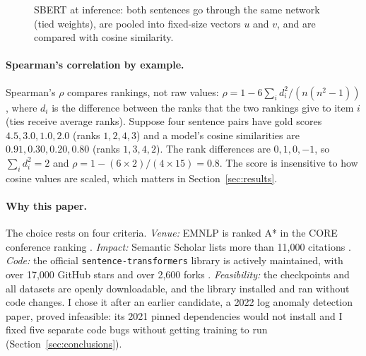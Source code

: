 \documentclass[11pt]{article}
\begin{document}
\begin{figure}[t]
\centering
{}
\caption{SBERT at inference: both sentences go through the same network (tied weights), are pooled into fixed-size vectors $u$ and $v$, and are compared with cosine similarity.}
\label{fig:sbert}
\end{figure}

\paragraph{Spearman's correlation by example.}
Spearman's $\rho$ compares rankings, not raw values: $\rho = 1 - 6\sum_i d_i^2 / (n(n^2-1))$, where $d_i$ is the difference between the ranks that the two rankings give to item $i$ (ties receive average ranks). Suppose four sentence pairs have gold scores $4.5, 3.0, 1.0, 2.0$ (ranks $1,2,4,3$) and a model's cosine similarities are $0.91, 0.30, 0.20, 0.80$ (ranks $1,3,4,2$). The rank differences are $0,1,0,-1$, so $\sum_i d_i^2 = 2$ and $\rho = 1 - (6\times 2)/(4\times 15) = 0.8$. The score is insensitive to how cosine values are scaled, which matters in Section~\ref{sec:results}.

\paragraph{Why this paper.}
The choice rests on four criteria. \emph{Venue:} EMNLP is ranked A* in the CORE conference ranking \citep{portalcore}. \emph{Impact:} Semantic Scholar lists more than 11,000 citations \citep{semanticscholar2019sbert}. \emph{Code:} the official \texttt{sentence-transformers} library is actively maintained, with over 17,000 GitHub stars and over 2,600 forks \citep{sentbert_repo}. \emph{Feasibility:} the checkpoints and all datasets are openly downloadable, and the library installed and ran without code changes. I chose it after an earlier candidate, a 2022 log anomaly detection paper, proved infeasible: its 2021 pinned dependencies would not install and I fixed five separate code bugs without getting training to run (Section~\ref{sec:conclusions}).
\end{document}
